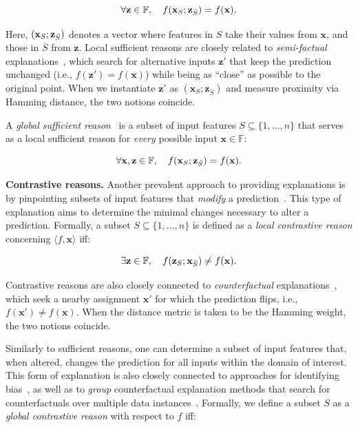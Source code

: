 \documentclass{article}
\newcommand{\z}{\textbf{z}}
\newcommand{\x}{\textbf{x}}
\begin{document}
\begin{equation}
    \forall \z\in\mathbb{F}, \quad f(\x_S;\z_{\Bar{S}})=f(\x).
\end{equation}

Here, $(\x_S;\z_{\Bar{S}})$ denotes a vector where features in $S$ take their values from $\x$, and those in $\overline{S}$ from $\z$. Local sufficient reasons are closely related to \emph{semi-factual} explanations~\citep{kenny2021generating, alfano2025even}, which search for alternative inputs $\mathbf{z}'$ that keep the prediction unchanged (i.e., $f(\mathbf{z}') = f(\mathbf{x})$) while being as ``close'' as possible to the original point. When we instantiate $\mathbf{z}'$ as $(\x_S; \z_{\bar{S}})$ and measure proximity via Hamming distance, the two notions coincide.

A \emph{global sufficient reason}~\citep{bassanlocal} is a subset of input features $S \subseteq \{1, \ldots, n\}$ that serves as a local sufficient reason for \emph{every} possible input $\x \in \mathbb{F}$:

\begin{equation}
    \forall \x,\z\in\mathbb{F}, \quad f(\x_S;\z_{\Bar{S}})=f(\x).
\end{equation}

\textbf{Contrastive reasons.} Another prevalent approach to providing explanations is by pinpointing subsets of input features that \emph{modify} a prediction~\citep{dhurandhar2018explanations, mothilal2020explaining, guidotti2024counterfactual}. This type of explanation aims to determine the minimal changes necessary to alter a prediction. Formally, a subset $S\subseteq \{1,\ldots, n\}$ is defined as a \emph{local contrastive reason} concerning $\langle f,\x\rangle$ iff:

\begin{equation}
     \exists\z\in\mathbb{F}, \quad f(\z_S;\x_{\Bar{S}})\neq f(\x).
\end{equation}

Contrastive reasons are also closely connected to \emph{counterfactual} explanations~\citep{guidotti2024counterfactual, mothilal2020explaining}, which seek a nearby assignment $\x'$ for which the prediction flips, i.e., $f(\x') \neq f(\x)$. When the distance metric is taken to be the Hamming weight, the two notions coincide.

Similarly to sufficient reasons, one can determine a subset of input features that, when altered, changes the prediction for all inputs within the domain of interest. This form of explanation is also closely connected to approaches for identifying bias~\citep{ArBaBaPeSu21, bassanlocal, darwiche2020reasons}, as well as to \emph{group} counterfactual explanation methods that search for counterfactuals over multiple data instances~\citep{carrizosa2024mathematical, warren2024explaining}. Formally, we define a subset $S$ as a \emph{global contrastive reason} with respect to $f$ iff:
\end{document}
